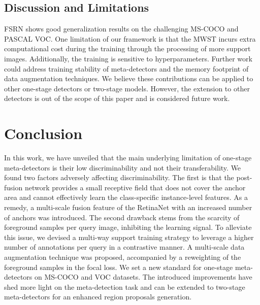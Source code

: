 \documentclass[10pt,twocolumn,letterpaper]{article}
\begin{document}
\subsection{Discussion and Limitations}
FSRN shows good generalization results on the challenging MS-COCO and PASCAL VOC. One limitation of our framework is that the MWST incurs extra computational cost during the training through the processing of more support images. Additionally, the training is sensitive to hyperparameters. Further work could address training stability of meta-detectors and the memory footprint of data augmentation techniques. We believe these contributions can be applied to other one-stage detectors or two-stage models. However, the extension to other detectors is out of the scope of this paper and is considered future work. 






\section{Conclusion}
In this work, we have unveiled that the main underlying limitation of one-stage meta-detectors is their low discriminability and not their transferability. We found two factors adversely affecting discriminability. The first is that the post-fusion network provides a small receptive field that does not cover the anchor area and cannot effectively learn the class-specific instance-level features. As a remedy, a multi-scale fusion feature of the RetinaNet with an increased number of anchors was introduced. The second drawback stems from the scarcity of foreground samples per query image, inhibiting the learning signal. To alleviate this issue, we devised a multi-way support training strategy to leverage a higher number of annotations per query in a contrastive manner. A multi-scale data augmentation technique was proposed, accompanied by a reweighting of the foreground samples in the focal loss. We set a new standard for one-stage meta-detectors on MS-COCO and VOC datasets. 
The introduced improvements have shed more light on the meta-detection task and can be extended to two-stage meta-detectors for an enhanced region proposals generation.   

\clearpage

{\small


}

\clearpage
\end{document}
